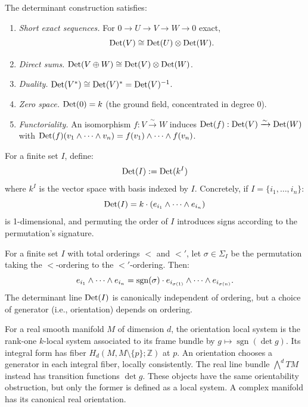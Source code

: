 \begin{proposition}
\label{prop:det-properties}
The determinant construction satisfies:
\begin{enumerate}[label=(\roman*)]
\item \emph{Short exact sequences.} For $0 \to U \to V \to W \to 0$ exact,
\[
\mathrm{Det}(V) \cong \mathrm{Det}(U) \otimes \mathrm{Det}(W).
\]
\item \emph{Direct sums.} $\mathrm{Det}(V \oplus W) \cong \mathrm{Det}(V) \otimes \mathrm{Det}(W)$.
\item \emph{Duality.} $\mathrm{Det}(V^*) \cong \mathrm{Det}(V)^* = \mathrm{Det}(V)^{-1}$.
\item \emph{Zero space.} $\mathrm{Det}(0) = k$ (the ground field, concentrated in degree 0).
\item \emph{Functoriality.} An isomorphism $f: V \xrightarrow{\sim} W$ induces 
$\mathrm{Det}(f): \mathrm{Det}(V) \xrightarrow{\sim} \mathrm{Det}(W)$ with $\mathrm{Det}(f)(v_1 \wedge \cdots \wedge v_n) 
= f(v_1) \wedge \cdots \wedge f(v_n)$.
\end{enumerate}
\end{proposition}

\begin{definition}
\label{def:det-set}
For a finite set $I$, define:
\[
\mathrm{Det}(I) := \mathrm{Det}(k^I)
\]
where $k^I$ is the vector space with basis indexed by $I$. Concretely, if 
$I = \{i_1, \ldots, i_n\}$:
\[
\mathrm{Det}(I) = k \cdot (e_{i_1} \wedge \cdots \wedge e_{i_n})
\]
is 1-dimensional, and permuting the order of $I$ introduces signs according to 
the permutation's signature.
\end{definition}

\begin{lemma}
\label{lem:det-ordering}
For a finite set $I$ with total orderings $<$ and $<'$, let $\sigma \in \Sigma_I$ 
be the permutation taking the $<$-ordering to the $<'$-ordering. Then:
\[
e_{i_1} \wedge \cdots \wedge e_{i_n} = \operatorname{sgn}(\sigma) \cdot e_{i_{\sigma(1)}} \wedge \cdots \wedge e_{i_{\sigma(n)}}.
\]
The determinant line $\mathrm{Det}(I)$ is canonically independent of ordering, but a 
choice of generator (i.e., orientation) depends on ordering.
\end{lemma}

\begin{definition}
\label{def:orientation-line}
For a real smooth manifold $M$ of dimension $d$, the orientation local system
is the rank-one $k$-local system associated to its frame bundle by
$g\mapsto\operatorname{sgn}(\det g)$.
Its integral form has fiber $H_d(M,M\setminus\{p\};\mathbb Z)$ at $p$.
An orientation chooses a generator in each integral fiber, locally consistently.
The real line bundle $\bigwedge^d TM$ instead has transition functions $\det g$.
These objects have the same orientability obstruction, but only the former is defined as a local system.
A complex manifold has its canonical real orientation.
\end{definition}

